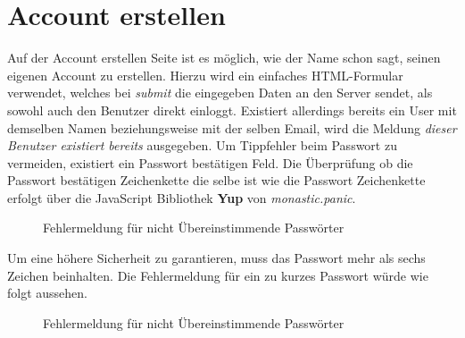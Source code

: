 \newpage
\section{Account erstellen}

Auf der Account erstellen Seite ist es möglich, wie der Name schon sagt, seinen eigenen Account zu erstellen. Hierzu wird ein 
einfaches HTML-Formular verwendet, welches bei \textit{submit} die eingegeben Daten an den Server sendet,
als sowohl auch den Benutzer direkt einloggt. Existiert allerdings bereits ein User mit demselben Namen 
beziehungsweise mit der selben Email, wird die Meldung \textit{dieser Benutzer existiert bereits} ausgegeben. Um 
Tippfehler beim Passwort zu vermeiden, existiert ein Passwort bestätigen Feld. Die Überprüfung ob die
Passwort bestätigen Zeichenkette die selbe ist wie die Passwort Zeichenkette erfolgt über die 
JavaScript Bibliothek \textbf{Yup} von \textit{monastic.panic}.

\begin{figure}[H]
    \begin{center}
      \caption{Fehlermeldung für nicht Übereinstimmende Passwörter}
    \end{center}
\end{figure}

\newpage
Um eine höhere Sicherheit zu garantieren, muss das Passwort mehr als sechs Zeichen beinhalten. Die 
Fehlermeldung für ein zu kurzes Passwort würde wie folgt aussehen.

\begin{figure}[H]
    \begin{center}
      \caption{Fehlermeldung für nicht Übereinstimmende Passwörter}
    \end{center}
\end{figure}


\label{createAccount}